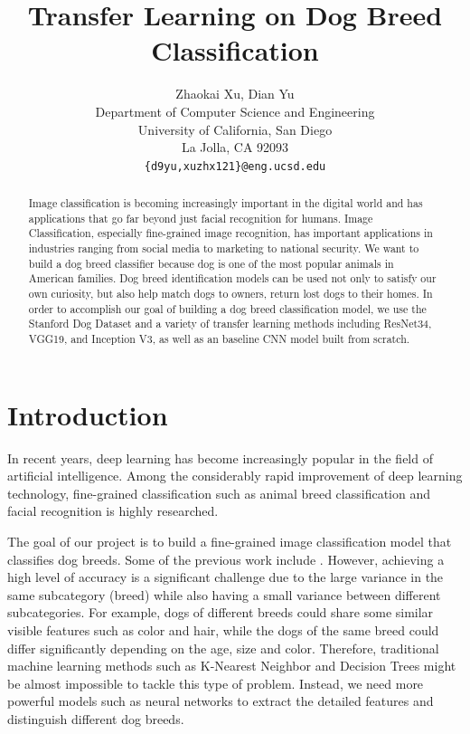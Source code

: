 \documentclass{article}
\title{Transfer Learning on Dog Breed Classification}
\author{
Zhaokai Xu, Dian Yu \\
Department of Computer Science and Engineering \\
University of California, San Diego \\
La Jolla, CA 92093 \\
\texttt{\{d9yu,xuzhx121\}@eng.ucsd.edu} \\
}
\begin{document}
\maketitle

\begin{abstract}
 Image classification is becoming increasingly important in the digital world and has applications that go far beyond just facial recognition for humans. Image Classification, especially fine-grained image recognition, has important applications in industries ranging from social media to marketing to national security. We want to build a dog breed classifier because dog is one of the most popular animals in American families. Dog breed identification models can be used not only to satisfy our own curiosity, but also help match dogs to owners, return lost dogs to their homes. In order to accomplish our goal of building a dog breed classification model, we use the Stanford Dog Dataset and a variety of transfer learning methods including ResNet34, VGG19, and Inception V3, as well as an baseline CNN model built from scratch.
\end{abstract}

\section{Introduction}
In recent years, deep learning has become increasingly popular in the field of artificial intelligence. Among the considerably rapid improvement of deep learning technology, fine-grained classification such as animal breed classification and facial recognition is highly researched. 

The goal of our project is to build a fine-grained image classification model that classifies dog breeds. Some of the previous work include \cite{dog_breed_classification}. However, achieving a high level of accuracy is a significant challenge due to the large variance in the same subcategory (breed) while also having a small variance between different subcategories. For example, dogs of different breeds could share some similar visible features such as color and hair, while the dogs of the same breed could differ significantly depending on the age, size and color. Therefore, traditional machine learning methods such as K-Nearest Neighbor and Decision Trees might be almost impossible to tackle this type of problem. Instead, we need more powerful models such as neural networks to extract the detailed features and distinguish different dog breeds. 
\end{document}
